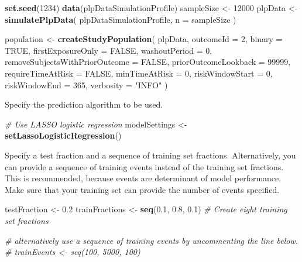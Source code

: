\documentclass[
]{article}
\newenvironment{Shaded}{\begin{snugshade}}{\end{snugshade}}
\newcommand{\CommentTok}[1]{\textcolor[rgb]{0.56,0.35,0.01}{\textit{#1}}}
\newcommand{\DataTypeTok}[1]{\textcolor[rgb]{0.13,0.29,0.53}{#1}}
\newcommand{\DecValTok}[1]{\textcolor[rgb]{0.00,0.00,0.81}{#1}}
\newcommand{\FloatTok}[1]{\textcolor[rgb]{0.00,0.00,0.81}{#1}}
\newcommand{\KeywordTok}[1]{\textcolor[rgb]{0.13,0.29,0.53}{\textbf{#1}}}
\newcommand{\NormalTok}[1]{#1}
\newcommand{\OtherTok}[1]{\textcolor[rgb]{0.56,0.35,0.01}{#1}}
\newcommand{\StringTok}[1]{\textcolor[rgb]{0.31,0.60,0.02}{#1}}
\begin{document}
\begin{Shaded}
\begin{Highlighting}[]
\KeywordTok{set.seed}\NormalTok{(}\DecValTok{1234}\NormalTok{)}
\KeywordTok{data}\NormalTok{(plpDataSimulationProfile)}
\NormalTok{sampleSize <-}\StringTok{ }\DecValTok{12000}
\NormalTok{plpData <-}\StringTok{ }\KeywordTok{simulatePlpData}\NormalTok{(}
\NormalTok{  plpDataSimulationProfile,}
  \DataTypeTok{n =}\NormalTok{ sampleSize}
\NormalTok{)}

\NormalTok{population <-}\StringTok{ }\KeywordTok{createStudyPopulation}\NormalTok{(}
\NormalTok{  plpData,}
  \DataTypeTok{outcomeId =} \DecValTok{2}\NormalTok{,}
  \DataTypeTok{binary =} \OtherTok{TRUE}\NormalTok{,}
  \DataTypeTok{firstExposureOnly =} \OtherTok{FALSE}\NormalTok{,}
  \DataTypeTok{washoutPeriod =} \DecValTok{0}\NormalTok{,}
  \DataTypeTok{removeSubjectsWithPriorOutcome =} \OtherTok{FALSE}\NormalTok{,}
  \DataTypeTok{priorOutcomeLookback =} \DecValTok{99999}\NormalTok{,}
  \DataTypeTok{requireTimeAtRisk =} \OtherTok{FALSE}\NormalTok{,}
  \DataTypeTok{minTimeAtRisk =} \DecValTok{0}\NormalTok{,}
  \DataTypeTok{riskWindowStart =} \DecValTok{0}\NormalTok{,}
  \DataTypeTok{riskWindowEnd =} \DecValTok{365}\NormalTok{,}
  \DataTypeTok{verbosity =} \StringTok{"INFO"}
\NormalTok{)}
\end{Highlighting}
\end{Shaded}

Specify the prediction algorithm to be used.

\begin{Shaded}
\begin{Highlighting}[]
\CommentTok{# Use LASSO logistic regression}
\NormalTok{modelSettings <-}\StringTok{ }\KeywordTok{setLassoLogisticRegression}\NormalTok{()}
\end{Highlighting}
\end{Shaded}

Specify a test fraction and a sequence of training set fractions.
Alternatively, you can provide a sequence of training events instead of
the training set fractions. This is recommended, because events are
determinant of model performance. Make sure that your training set can
provide the number of events specified.

\begin{Shaded}
\begin{Highlighting}[]
\NormalTok{testFraction <-}\StringTok{ }\FloatTok{0.2}
\NormalTok{trainFractions <-}\StringTok{ }\KeywordTok{seq}\NormalTok{(}\FloatTok{0.1}\NormalTok{, }\FloatTok{0.8}\NormalTok{, }\FloatTok{0.1}\NormalTok{) }\CommentTok{# Create eight training set fractions}

\CommentTok{# alternatively use a sequence of training events by uncommenting the line below.}
\CommentTok{# trainEvents <- seq(100, 5000, 100)}
\end{Highlighting}
\end{Shaded}
\end{document}
